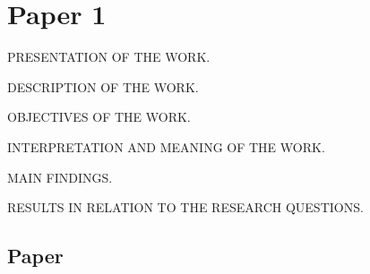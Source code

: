 \chapter{Paper 1}%
\label{ch:paper1}

PRESENTATION OF THE WORK.

DESCRIPTION OF THE WORK.

OBJECTIVES OF THE WORK.

INTERPRETATION AND MEANING OF THE WORK.

MAIN FINDINGS.

RESULTS IN RELATION TO THE RESEARCH QUESTIONS.

\section{Paper}

\lipsum[23]
